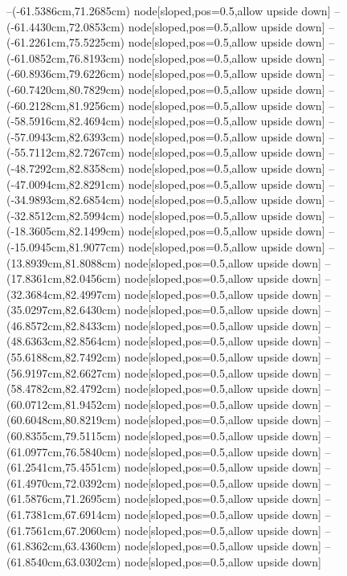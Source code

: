 --(-61.5386cm,71.2685cm) node[sloped,pos=0.5,allow upside down]{\ArrowIn}
--(-61.4430cm,72.0853cm) node[sloped,pos=0.5,allow upside down]{\arrowIn}
--(-61.2261cm,75.5225cm) node[sloped,pos=0.5,allow upside down]{\ArrowIn}
--(-61.0852cm,76.8193cm) node[sloped,pos=0.5,allow upside down]{\ArrowIn}
--(-60.8936cm,79.6226cm) node[sloped,pos=0.5,allow upside down]{\ArrowIn}
--(-60.7420cm,80.7829cm) node[sloped,pos=0.5,allow upside down]{\ArrowIn}
--(-60.2128cm,81.9256cm) node[sloped,pos=0.5,allow upside down]{\ArrowIn}
--(-58.5916cm,82.4694cm) node[sloped,pos=0.5,allow upside down]{\ArrowIn}
--(-57.0943cm,82.6393cm) node[sloped,pos=0.5,allow upside down]{\ArrowIn}
--(-55.7112cm,82.7267cm) node[sloped,pos=0.5,allow upside down]{\ArrowIn}
--(-48.7292cm,82.8358cm) node[sloped,pos=0.5,allow upside down]{\ArrowIn}
--(-47.0094cm,82.8291cm) node[sloped,pos=0.5,allow upside down]{\ArrowIn}
--(-34.9893cm,82.6854cm) node[sloped,pos=0.5,allow upside down]{\ArrowIn}
--(-32.8512cm,82.5994cm) node[sloped,pos=0.5,allow upside down]{\ArrowIn}
--(-18.3605cm,82.1499cm) node[sloped,pos=0.5,allow upside down]{\ArrowIn}
--(-15.0945cm,81.9077cm) node[sloped,pos=0.5,allow upside down]{\ArrowIn}
--(13.8939cm,81.8088cm) node[sloped,pos=0.5,allow upside down]{\ArrowIn}
--(17.8361cm,82.0456cm) node[sloped,pos=0.5,allow upside down]{\ArrowIn}
--(32.3684cm,82.4997cm) node[sloped,pos=0.5,allow upside down]{\ArrowIn}
--(35.0297cm,82.6430cm) node[sloped,pos=0.5,allow upside down]{\ArrowIn}
--(46.8572cm,82.8433cm) node[sloped,pos=0.5,allow upside down]{\ArrowIn}
--(48.6363cm,82.8564cm) node[sloped,pos=0.5,allow upside down]{\ArrowIn}
--(55.6188cm,82.7492cm) node[sloped,pos=0.5,allow upside down]{\ArrowIn}
--(56.9197cm,82.6627cm) node[sloped,pos=0.5,allow upside down]{\ArrowIn}
--(58.4782cm,82.4792cm) node[sloped,pos=0.5,allow upside down]{\ArrowIn}
--(60.0712cm,81.9452cm) node[sloped,pos=0.5,allow upside down]{\ArrowIn}
--(60.6048cm,80.8219cm) node[sloped,pos=0.5,allow upside down]{\ArrowIn}
--(60.8355cm,79.5115cm) node[sloped,pos=0.5,allow upside down]{\ArrowIn}
--(61.0977cm,76.5840cm) node[sloped,pos=0.5,allow upside down]{\ArrowIn}
--(61.2541cm,75.4551cm) node[sloped,pos=0.5,allow upside down]{\ArrowIn}
--(61.4970cm,72.0392cm) node[sloped,pos=0.5,allow upside down]{\ArrowIn}
--(61.5876cm,71.2695cm) node[sloped,pos=0.5,allow upside down]{\arrowIn}
--(61.7381cm,67.6914cm) node[sloped,pos=0.5,allow upside down]{\ArrowIn}
--(61.7561cm,67.2060cm) node[sloped,pos=0.5,allow upside down]{\arrowIn}
--(61.8362cm,63.4360cm) node[sloped,pos=0.5,allow upside down]{\ArrowIn}
--(61.8540cm,63.0302cm) node[sloped,pos=0.5,allow upside down]{\arrowIn}
